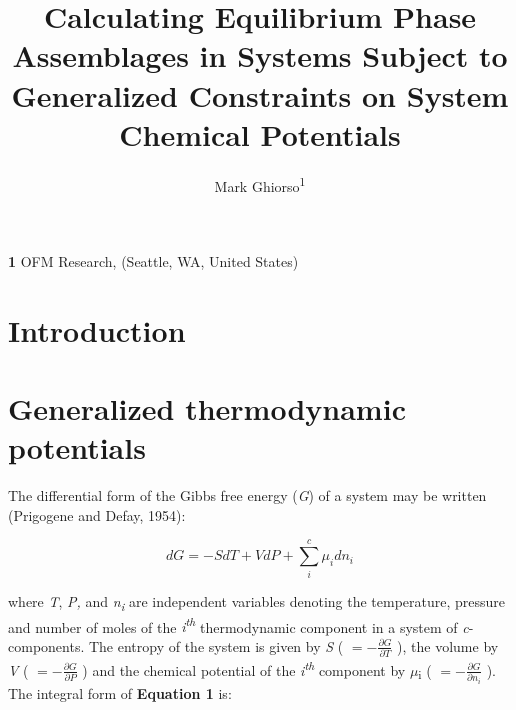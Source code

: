 \documentclass[11pt, titlepage, twoside]{article}
\begin{document}
\title{Calculating Equilibrium Phase Assemblages in Systems Subject to Generalized Constraints on System Chemical Potentials}\author{Mark Ghiorso\textsuperscript{1}}
\maketitle
\textbf{1} OFM Research,  (Seattle, WA,  United States)
\section{Introduction}\label{MPSection:261389CE-F82D-4E5F-FE73-6C36D5950E5B}




\section{Generalized thermodynamic potentials}\label{MPSection:E7CF61A7-68DC-4778-883A-D29F41BD8D0E}

The differential form of the Gibbs free energy (\emph{G}) of a system may be written (Prigogene and Defay, 1954):


\begin{MPEquation}[!ht]
\begin{equation}
dG =  - SdT + VdP + \sum\limits_i^c {{\mu _i}d{n_i}}
\end{equation}
\label{MPEquationElement:6E22730B-B717-4B8C-B6B8-4D057A4646E0}
\end{MPEquation}
where \emph{T}, \emph{P,} and \emph{n\textsubscript{i}} are independent variables denoting the temperature, pressure and number of moles of the \emph{i\textsuperscript{th}} thermodynamic component in a system of \emph{c}-components. The entropy of the system is given by \emph{S} ( $=  - \frac{{\partial G}}{{\partial T}}$ ), the volume by \emph{V} ( $=  - \frac{{\partial G}}{{\partial P}}$ ) and the chemical potential of the \emph{i\textsuperscript{th}} component by $\mu$\textsubscript{i} ( $=  - \frac{{\partial G}}{{\partial {n_i}}}$ ). The integral form of \textbf{Equation 1} is:
\end{document}
